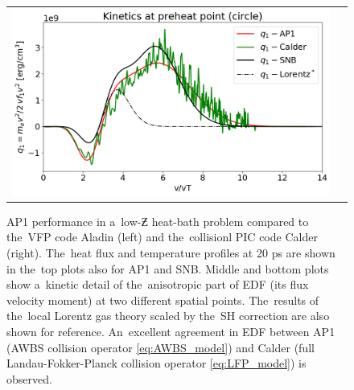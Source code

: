 \begin{figure}[htb]
\begin{center}
\begin{tabular}{cc}
      \includegraphics[width=\figscale\textwidth]{../VFPdata/C7_Calder_case5_nonlocal_kinetics.png}
	\end{tabular}
  \caption{  
  AP1 performance in a~low-$\Zbar$ heat-bath problem compared to the~VFP code 
  Aladin (left) and the~collisionl PIC code Calder (right). 
  The~heat flux and temperature
  profiles at 20 ps are shown in the~top plots also for AP1 and SNB.
  Middle and bottom plots show a~kinetic detail of the~anisotropic part
  of EDF (its flux velocity moment) at two different spatial points. 
  The~results of the~local Lorentz gas theory scaled by the~SH correction
  are also shown for reference. An~excellent agreement in EDF between
  AP1 (AWBS collision operator \eqref{eq:AWBS_model}) 
  and Calder (full Landau-Fokker-Planck collision operator 
  \eqref{eq:LFP_model}) is observed.
  }
  \label{fig:C7_AladinCalder_case5}
  \end{center} 
\end{figure}

